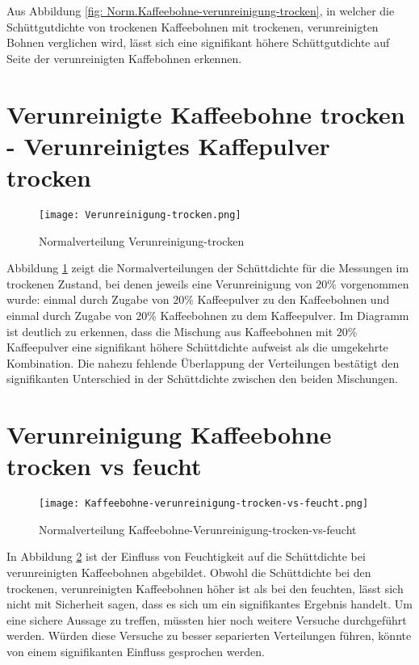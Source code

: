 Aus Abbildung \ref{fig: Norm.Kaffeebohne-verunreinigung-trocken}, in welcher die Schüttgutdichte von trockenen Kaffeebohnen mit
trockenen, verunreinigten Bohnen verglichen wird, lässt sich eine signifikant höhere Schüttgutdichte auf Seite der verunreinigten
Kaffebohnen erkennen.

\section{Verunreinigte Kaffeebohne trocken - Verunreinigtes Kaffepulver trocken}
 \begin{figure}[H]
    \centering
    \texttt{[image: Verunreinigung-trocken.png]}
    \caption{Normalverteilung Verunreinigung-trocken}
    \label{fig: Norm.Verunreinigung-trocken}
\end{figure}

Abbildung \ref{fig: Norm.Verunreinigung-trocken} zeigt die Normalverteilungen der Schüttdichte für die Messungen im trockenen Zustand, bei denen jeweils eine Verunreinigung von $20\%$ vorgenommen wurde: 
einmal durch Zugabe von $20\%$ Kaffeepulver zu den Kaffeebohnen und einmal durch Zugabe von $20\%$ Kaffeebohnen zu dem Kaffeepulver. 
Im Diagramm ist deutlich zu erkennen, dass die Mischung aus Kaffeebohnen mit $20\%$ Kaffeepulver eine signifikant höhere Schüttdichte 
aufweist als die umgekehrte Kombination. 
Die nahezu fehlende Überlappung der Verteilungen bestätigt den signifikanten Unterschied in der Schüttdichte zwischen den beiden 
Mischungen.

\section{Verunreinigung Kaffeebohne trocken vs feucht}
    \begin{figure}[H]
        \centering
        \texttt{[image: Kaffeebohne-verunreinigung-trocken-vs-feucht.png]}
        \caption{Normalverteilung Kaffeebohne-Verunreinigung-trocken-vs-feucht}
        \label{fig: Norm.Kaffeebohne-verunreinigung-trocken-vs-feucht}
    \end{figure}

    In Abbildung \ref{fig: Norm.Kaffeebohne-verunreinigung-trocken-vs-feucht} ist der Einfluss
    von Feuchtigkeit auf die Schüttdichte bei verunreinigten Kaffeebohnen abgebildet. Obwohl die
    Schüttdichte bei den trockenen, verunreinigten Kaffeebohnen höher ist als bei den feuchten,
    lässt sich nicht mit Sicherheit sagen, dass es sich um ein signifikantes Ergebnis handelt.
    Um eine sichere Aussage zu treffen, müssten hier noch weitere Versuche durchgeführt werden.
    Würden diese Versuche zu besser separierten Verteilungen führen, könnte von einem
    signifikanten Einfluss gesprochen werden.

